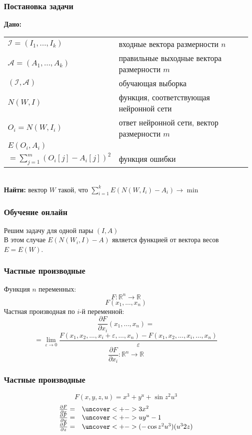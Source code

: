 \documentclass[24pt,pdf,hyperref={unicode}]{beamer}
\newcommand{\dd}[2]{\frac{\partial #1}{\partial #2}}
\begin{document}
\begin{frame}\frametitle{Постановка задачи}
{\bf Дано:}
\begin{tabular}{p{4cm} p{6cm}}
 $\mathcal{I}=(I_1,\ldots,I_k)$ & входные вектора размерности $n$\\[0.1cm]
 $\mathcal{A}=(A_1,\ldots,A_k)$ & правильные выходные вектора размерности $m$\\[0.1cm]
 $(\mathcal{I},\mathcal{A})$ & обучающая выборка  \\[0.1cm]
 $N(W,I)$ & функция, соответствующая нейронной сети \\[0.1cm]
 $O_i=N(W,I_i)$ & ответ нейронной сети, вектор размерности $m$ \\[0.1cm]
$E(O_i,A_i)$ & \\
$=\sum_{j=1}^{m} (O_i[j]-A_i[j])^2 $ & функция ошибки \\
 \end{tabular}\\[1cm]
{\bf Найти:}
вектор $W$ такой, что $\sum_{i=1}^k E(N(W,I_i)-A_i)\rightarrow \min$
\end{frame}


\begin{frame}\frametitle{Обучение онлайн}
Решим задачу для одной пары $(I,A)$ \\[2cm]

В этом случае $E(N(W_i,I)-A)$ является функцией от вектора весов $E=E(W)$. 
\end{frame}

\begin{frame}\frametitle{Частные производные}
Функция $n$ переменных:
$$
F:\mathbb{R}^n\rightarrow\mathbb{R} 
$$
$$
F(x_1,\ldots,x_n)
$$
Частная производная по $i$-й переменной:
$$
\dd{F}{x_i}(x_1,\ldots,x_n)=
$$
$$
=\lim_{\varepsilon\rightarrow 0}\frac{F(x_1,x_2,\ldots,x_i+\varepsilon,\ldots,x_n)-F(x_1,x_2,\ldots,x_i,\ldots,x_n)}{\varepsilon}
$$
$$
\dd{F}{x_i}:\mathbb{R}^n\rightarrow\mathbb{R}
$$

\end{frame}
\uncover<+->{}
\begin{frame}\frametitle{Частные производные}
$$
F(x,y,z,u)=x^3+y^u+\sin z^2u^3
$$
$$
\begin{array}{l l}
\dd{F}{x} = & \uncover<+->{3x^2} \\
\dd{F}{y}= & \uncover<+->{uy^u-1} \\
\dd{F}{z}= & \uncover<+->{(-\cos z^2u^3)(u^32z)}
\end{array}
$$
\end{frame}
\end{document}
